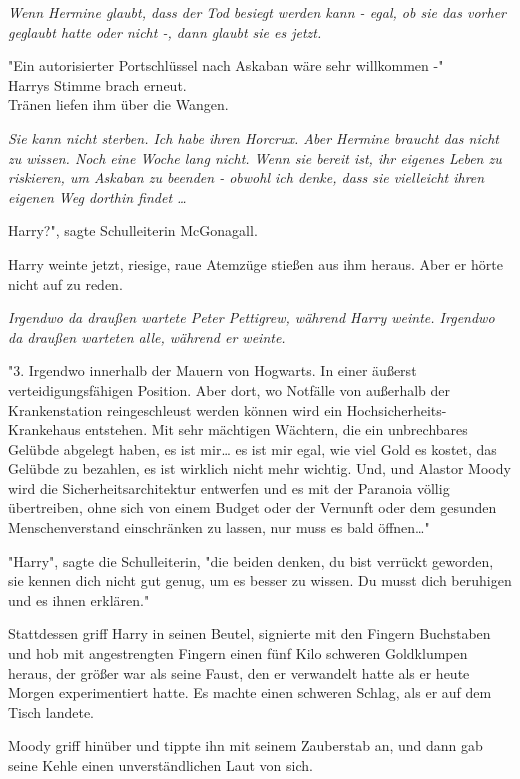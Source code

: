 {\emph{Wenn Hermine glaubt, dass der Tod besiegt werden kann - egal, ob sie das vorher geglaubt hatte oder nicht -, dann glaubt sie es jetzt.}

"Ein autorisierter Portschlüssel nach Askaban wäre sehr willkommen -"\\ Harrys Stimme brach erneut.\\ Tränen liefen ihm über die Wangen.

\emph{Sie kann nicht sterben. Ich habe ihren Horcrux. Aber Hermine braucht das nicht zu wissen. Noch eine Woche lang nicht. Wenn sie bereit ist, ihr eigenes Leben zu riskieren, um Askaban zu beenden - obwohl ich denke, dass sie vielleicht ihren eigenen Weg dorthin findet …}

Harry?", sagte Schulleiterin McGonagall.

Harry weinte jetzt, riesige, raue Atemzüge stießen aus ihm heraus. Aber er hörte nicht auf zu reden.

\emph{Irgendwo da draußen wartete Peter Pettigrew, während Harry weinte. Irgendwo da draußen warteten alle, während er weinte.}

"3. Irgendwo innerhalb der Mauern von Hogwarts. In einer äußerst verteidigungsfähigen Position. Aber dort, wo Notfälle von außerhalb der Krankenstation reingeschleust werden können wird ein Hochsicherheits-Krankehaus entstehen. Mit sehr mächtigen Wächtern, die ein unbrechbares Gelübde abgelegt haben, es ist mir… es ist mir egal, wie viel Gold es kostet, das Gelübde zu bezahlen, es ist wirklich nicht mehr wichtig. Und, und Alastor Moody wird die Sicherheitsarchitektur entwerfen und es mit der Paranoia völlig übertreiben, ohne sich von einem Budget oder der Vernunft oder dem gesunden Menschenverstand einschränken zu lassen, nur muss es bald öffnen…"

"Harry", sagte die Schulleiterin, "die beiden denken, du bist verrückt geworden, sie kennen dich nicht gut genug, um es besser zu wissen. Du musst dich beruhigen und es ihnen erklären."

Stattdessen griff Harry in seinen Beutel, signierte mit den Fingern Buchstaben und hob mit angestrengten Fingern einen fünf Kilo schweren Goldklumpen heraus, der größer war als seine Faust, den er verwandelt hatte als er heute Morgen experimentiert hatte. Es machte einen schweren Schlag, als er auf dem Tisch landete.

Moody griff hinüber und tippte ihn mit seinem Zauberstab an, und dann gab seine Kehle einen unverständlichen Laut von sich.

}

